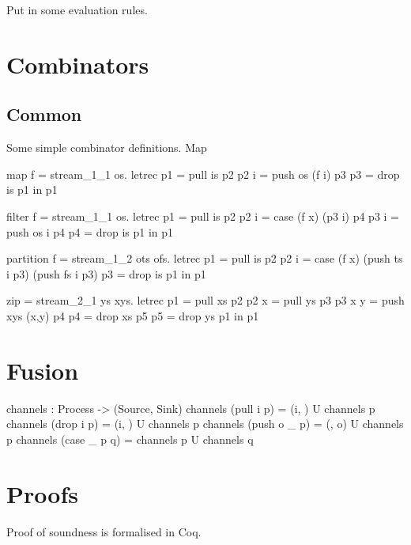 Put in some evaluation rules.

\section{Combinators}
\label{s:Combinators}

\subsection{Common}
\label{s:Combinators:Common}

Some simple combinator definitions.
Map 

\begin{code}
map f = stream_1_1 \is os.
  letrec
    p1   = pull is p2
    p2 i = push os (f i) p3
    p3   = drop is p1
  in p1
\end{code}

\begin{code}
filter f = stream_1_1 \is os.
  letrec
    p1   = pull is p2
    p2 i = case (f x) (p3 i) p4
    p3 i = push os i p4
    p4   = drop is p1
  in p1
\end{code}

\begin{code}
partition f = stream_1_2 \is ots ofs.
  letrec
    p1   = pull is p2
    p2 i = case (f x)
            (push ts i p3)
            (push fs i p3)
    p3   = drop is p1
  in p1
\end{code}

\begin{code}
zip = stream_2_1 \xs ys xys.
  letrec
    p1     = pull xs        p2
    p2 x   = pull ys        p3
    p3 x y = push xys (x,y) p4
    p4     = drop xs        p5
    p5     = drop ys        p1
  in p1
\end{code}

\section{Fusion}
\label{s:Fusion}

\begin{code}
channels : Process -> ({Source}, {Sink})
channels (pull i   p) = ({i}, {})  U channels p
channels (drop i   p) = ({i}, {})  U channels p
channels (push o _ p) = ({}, {o})  U channels p
channels (case _ p q) = channels p U channels q
\end{code}



\section{Proofs}
\label{s:Proofs}
Proof of soundness is formalised in Coq.


